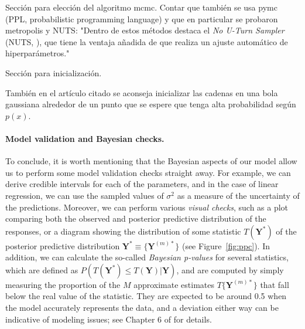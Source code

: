 \begin{outcomment}
  Sección para elección del algoritmo mcmc. Contar que también se usa pymc (PPL, probabilistic programming language) y que en particular se probaron metropolis y NUTS: "Dentro de estos métodos destaca el \textit{No U-Turn Sampler} (NUTS, \citet{hoffman2014no}), que tiene la ventaja añadida de que realiza un ajuste automático de hiperparámetros."

\end{outcomment}

\begin{outcomment}
  Sección para inicialización.

  También en el artículo citado se aconseja inicializar las cadenas en una bola gaussiana alrededor de un punto que se espere que tenga alta probabilidad según \(p(x)\).
\end{outcomment}


\paragraph{Model validation and Bayesian checks.} To conclude, it is worth mentioning that the Bayesian aspects of our model allow us to perform some model validation checks straight away. For example, we can derive credible intervals for each of the parameters, and in the case of linear regression, we can use the sampled values of \(\sigma^2\) as a measure of the uncertainty of the predictions. Moreover, we can perform various \textit{visual checks}, such as a plot comparing both the observed and posterior predictive distribution of the responses, or a diagram showing the distribution of some statistic \(T(\symbf Y^*)\) of the posterior predictive distribution \(\symbf Y^* \equiv \{\symbf Y^{(m)*}\}\) (see Figure~\ref{fig:ppc}). In addition, we can calculate the so-called \textit{Bayesian p-values} for several statistics, which are defined as \(P(T(\symbf Y^*)\leq T(\symbf Y)| \symbf Y)\), and are computed by simply measuring the proportion of the \(M\) approximate estimates \(T\{\symbf Y^{(m)*}\}\) that fall below the real value of the statistic. They are expected to be around 0.5 when the model accurately represents the data, and a deviation either way can be indicative of modeling issues; see Chapter 6 of \citet{gelman2013bayesian} for details.

